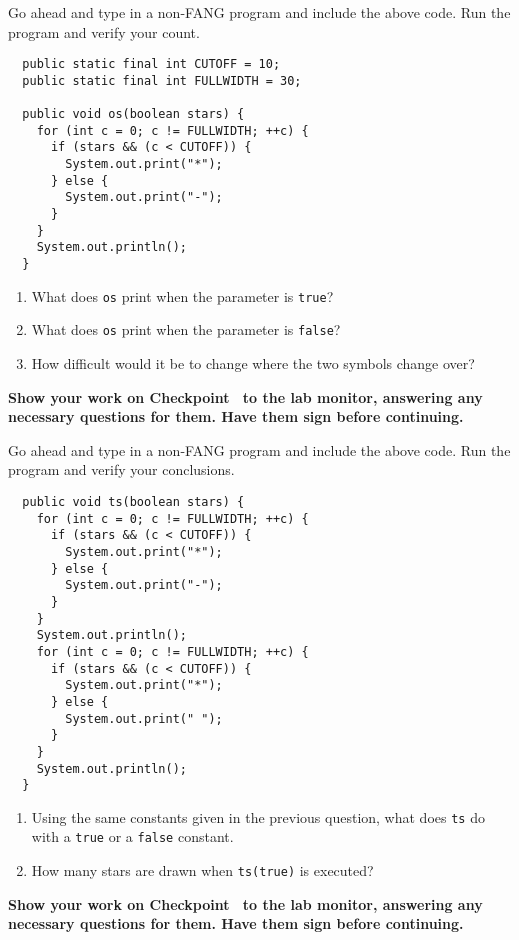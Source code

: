 \documentclass[12pt,oneside]{memoir}
\newcommand\code[1]{\lstinline^#1^}
\newenvironment{Checkpoint}[1]{%
  \begin{Exercise}[name={Checkpoint},title={#1}]}{%
  \end{Exercise}%
  \textbf{Show your work on Checkpoint~\theExercise{} to the lab monitor, %
    answering any necessary questions for them.  Have them sign before continuing.}}
\begin{document}
\begin{Checkpoint}{os}
  Go ahead and type in a non-FANG program and include the above
  code. Run the program and verify your count.

  \begin{lstlisting}
  public static final int CUTOFF = 10;
  public static final int FULLWIDTH = 30;
    
  public void os(boolean stars) {
    for (int c = 0; c != FULLWIDTH; ++c) {
      if (stars && (c < CUTOFF)) {
        System.out.print("*");
      } else {
        System.out.print("-");
      }
    }
    System.out.println();
  }
  \end{lstlisting}

  \begin{enumerate}
  \item What does \code{os} print when the parameter is \code{true}?
  \item What does \code{os} print when the parameter is \code{false}?
  \item How difficult would it be to change where the two symbols
    change over?
  \end{enumerate}
\end{Checkpoint}

\begin{Checkpoint}{ts}
  Go ahead and type in a non-FANG program and include the above
  code. Run the program and verify your conclusions.

  \begin{lstlisting}
  public void ts(boolean stars) {
    for (int c = 0; c != FULLWIDTH; ++c) {
      if (stars && (c < CUTOFF)) {
        System.out.print("*");
      } else {
        System.out.print("-");
      }
    }
    System.out.println();
    for (int c = 0; c != FULLWIDTH; ++c) {
      if (stars && (c < CUTOFF)) {
        System.out.print("*");
      } else {
        System.out.print(" ");
      }
    }
    System.out.println();
  }    
  \end{lstlisting}
  
  \begin{enumerate}
  \item Using the same constants given in the previous question, what
    does \code{ts} do with a \code{true} or a \code{false} constant.
  \item How many stars are drawn when \code{ts(true)} is executed?
  \end{enumerate}
\end{Checkpoint}
\end{document}
